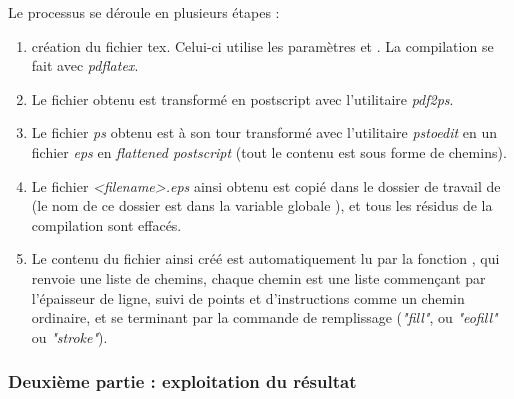 Le processus se déroule en plusieurs étapes :
    \begin{enumerate}
        \item création du fichier tex. Celui-ci utilise les paramètres  et . La compilation se fait avec \emph{pdflatex}.
        
        \item Le fichier obtenu est transformé en postscript avec l'utilitaire \emph{pdf2ps}.
        \item Le fichier \emph{ps} obtenu est à son tour transformé avec l'utilitaire \emph{pstoedit} en un fichier \emph{eps} en \emph{flattened postscript} (tout le contenu est sous forme de chemins).
        
        \item Le fichier \emph{<filename>.eps} ainsi obtenu est copié dans le dossier de travail de \luadrawenv (le nom de ce dossier est dans la variable globale ), et tous les résidus de la compilation sont effacés.
        
        \item Le contenu du fichier ainsi créé est automatiquement lu par la fonction , qui renvoie une liste de chemins, chaque chemin est une liste commençant par l'épaisseur de ligne, suivi de points et d'instructions comme un chemin ordinaire, et se terminant par la commande de remplissage (\emph{"fill"}, ou \emph{"eofill"} ou \emph{"stroke"}).
   \end{enumerate}
   
\subsubsection{Deuxième partie : exploitation du résultat}

